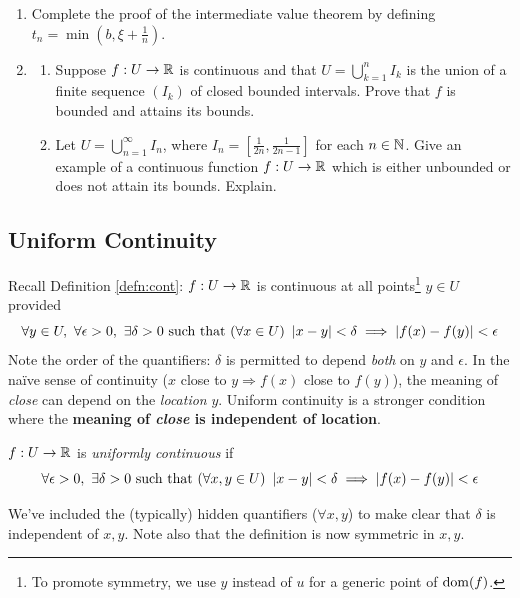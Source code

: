 \begin{exercises}
\begin{enumerate}
		
		\item\label{exs:ivtproof} Complete the proof of the intermediate value theorem by defining $t_n=\min(b,\xi+\frac 1n)$.
		
		
		\item\begin{enumerate}
		  \item Suppose $f:U\to\mathbb{R}$ is continuous and that $U=\bigcup\limits_{k=1}^nI_k$ is the union of a finite sequence $(I_k)$ of closed bounded intervals. Prove that $f$ is bounded and attains its bounds.
		  \item Let $U=\bigcup\limits_{n=1}^\infty I_n$, where $I_n=[\frac 1{2n},\frac 1{2n-1}]$ for each $n\in\mathbb{N}$. Give an example of a continuous function $f:U\to\mathbb{R}$ which is either unbounded or does not attain its bounds. Explain.
		\end{enumerate}
	\end{enumerate}
\end{exercises}


\clearpage


\subsection{Uniform Continuity}\label{sec:unifcont}

Recall Definition \ref{defn:cont}: $f:U\to\mathbb{R}$ is continuous at all points\footnote{%
	To promote symmetry, we use $y$ instead of $u$ for a generic point of $\operatorname{dom}(f)$.%
}
$y\in U$ provided
\[
	\forall y\in U,\ \forall\epsilon>0,\ \exists \delta>0\text{ such that }
	(\forall x\in U)\ \nm{x-y}<\delta
	\implies \nm{f(x)-f(y)}<\epsilon
\]
Note the order of the quantifiers: $\delta$ is permitted to depend \emph{both} on $y$ and $\epsilon$. In the naïve sense of continuity ($x$ close to $y\Longrightarrow f(x)$ close to $f(y)$), the meaning of \emph{close} can depend on the \emph{location} $y$. Uniform continuity is a stronger condition where the \textbf{meaning of \emph{close} is independent of location}.

\begin{defn}{}{}
	$f:U\to\mathbb{R}$ is \emph{uniformly continuous} if
	\[
		\forall\epsilon>0,\ \exists \delta>0\text{ such that }
		(\forall x,y\in U)\ \nm{x-y}<\delta
		\implies \nm{f(x)-f(y)}<\epsilon
	\]
\end{defn}
We've included the (typically) hidden quantifiers ($\forall x,y$) to make clear that $\delta$ is independent of $x,y$. Note also that the definition is now symmetric in $x,y$.


